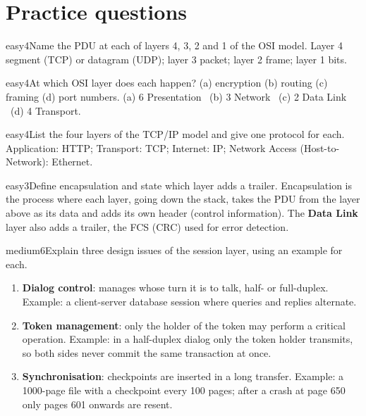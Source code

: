 \documentclass[10pt]{article}
\begin{document}
\section{Practice questions}
\setcounter{pq}{0}

\begin{practice}{easy}{4}Name the PDU at each of layers 4, 3, 2 and 1 of the OSI model.
\sol Layer 4 segment (TCP) or datagram (UDP); layer 3 packet; layer 2 frame; layer 1 bits.
\end{practice}

\begin{practice}{easy}{4}At which OSI layer does each happen? (a) encryption (b) routing (c) framing (d) port numbers.
\sol (a) 6 Presentation \ (b) 3 Network \ (c) 2 Data Link \ (d) 4 Transport.
\end{practice}

\begin{practice}{easy}{4}List the four layers of the TCP/IP model and give one protocol for each.
\sol Application: HTTP; Transport: TCP; Internet: IP; Network Access (Host-to-Network): Ethernet.
\end{practice}

\begin{practice}{easy}{3}Define encapsulation and state which layer adds a trailer.
\sol Encapsulation is the process where each layer, going down the stack, takes the PDU from the layer above as its data and adds its own header (control information). The \textbf{Data Link} layer also adds a trailer, the FCS (CRC) used for error detection.
\end{practice}

\begin{practice}{medium}{6}Explain three design issues of the session layer, using an example for each.
\sol
\begin{enumerate}
\item \textbf{Dialog control}: manages whose turn it is to talk, half- or full-duplex. Example: a client-server database session where queries and replies alternate.
\item \textbf{Token management}: only the holder of the token may perform a critical operation. Example: in a half-duplex dialog only the token holder transmits, so both sides never commit the same transaction at once.
\item \textbf{Synchronisation}: checkpoints are inserted in a long transfer. Example: a 1000-page file with a checkpoint every 100 pages; after a crash at page 650 only pages 601 onwards are resent.
\end{enumerate}
\end{practice}
\end{document}
